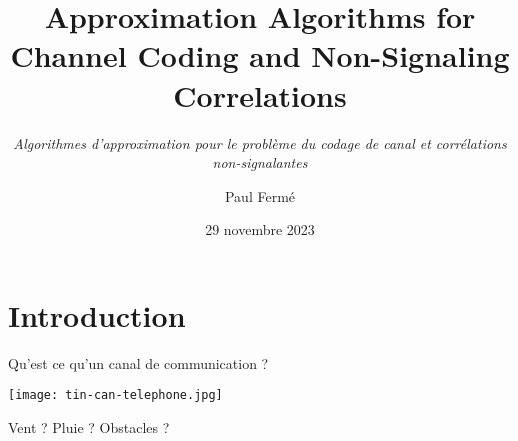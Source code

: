 \documentclass{beamer}
\title{Approximation Algorithms for Channel Coding and Non-Signaling Correlations}
\subtitle{\textit{Algorithmes d'approximation pour le problème du codage de canal et corrélations non-signalantes}}
\author{Paul Fermé}
\institute{ENS de Lyon}
\date{29 novembre 2023}
\theoremstyle{definition}
\theoremstyle{remark}
\begin{document}

\begin{frame}
  \titlepage
\end{frame}


\section{Introduction}
\begin{frame}{Qu'est ce qu'un canal de communication ?}
  \pause
  \begin{center}
    \texttt{[image: tin-can-telephone.jpg]}
    
      \pause
      Vent ? Pluie ? Obstacles ?
  \end{center}
\end{frame}
\end{document}
